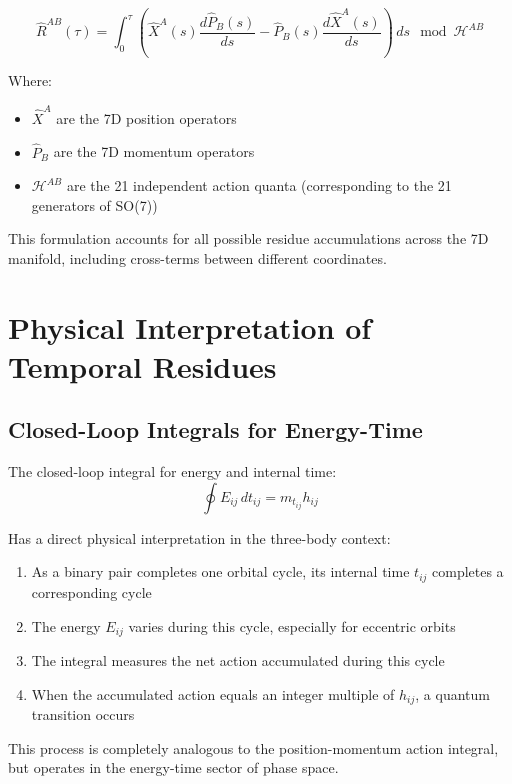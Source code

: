 \documentclass{article}
\begin{document}
\begin{equation}
\hat{R}^{AB}(\tau) = \int_0^\tau \left(\hat{X}^A(s) \frac{d\hat{P}_B(s)}{ds} - \hat{P}_B(s) \frac{d\hat{X}^A(s)}{ds}\right) \, ds \mod \mathcal{H}^{AB}
\end{equation}

Where:
\begin{itemize}
\item $\hat{X}^A$ are the 7D position operators
\item $\hat{P}_B$ are the 7D momentum operators
\item $\mathcal{H}^{AB}$ are the 21 independent action quanta (corresponding to the 21 generators of SO(7))
\end{itemize}

This formulation accounts for all possible residue accumulations across the 7D manifold, including cross-terms between different coordinates.

\section{Physical Interpretation of Temporal Residues}

\subsection{Closed-Loop Integrals for Energy-Time}

The closed-loop integral for energy and internal time:
\begin{equation}
\oint E_{ij} \, dt_{ij} = m_{t_{ij}} h_{ij}
\end{equation}

Has a direct physical interpretation in the three-body context:

\begin{enumerate}
\item As a binary pair completes one orbital cycle, its internal time $t_{ij}$ completes a corresponding cycle
\item The energy $E_{ij}$ varies during this cycle, especially for eccentric orbits
\item The integral measures the net action accumulated during this cycle
\item When the accumulated action equals an integer multiple of $h_{ij}$, a quantum transition occurs
\end{enumerate}

This process is completely analogous to the position-momentum action integral, but operates in the energy-time sector of phase space.
\end{document}
